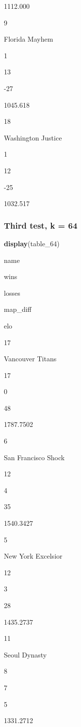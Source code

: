 \documentclass[]{article}
\newenvironment{Shaded}{\begin{snugshade}}{\end{snugshade}}
\newcommand{\KeywordTok}[1]{\textcolor[rgb]{0.13,0.29,0.53}{\textbf{#1}}}
\newcommand{\DecValTok}[1]{\textcolor[rgb]{0.00,0.00,0.81}{#1}}
\newcommand{\NormalTok}[1]{#1}
\begin{document}
{1112.000}

9

Florida Mayhem

1

13

{-27}

{1045.618}

18

Washington Justice

1

12

{-25}

{1032.517}

\subsubsection{Third test, k = 64}\label{third-test-k-64}

\begin{Shaded}
\begin{Highlighting}[]
\KeywordTok{display}\NormalTok{(table_}\DecValTok{64}\NormalTok{)}
\end{Highlighting}
\end{Shaded}

name

wins

losses

map\_diff

elo

17

Vancouver Titans

17

0

{48}

{1787.7502}

6

San Francisco Shock

12

4

{35}

{1540.3427}

5

New York Excelsior

12

3

{28}

{1435.2737}

11

Seoul Dynasty

8

7

{5}

{1331.2712}
\end{document}
